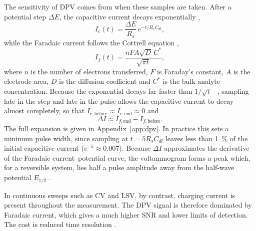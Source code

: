 The sensitivity of \ac{DPV} comes from when these samples are taken. After a potential step $\Delta E$, the capacitive current decays exponentially \cite{palmsens_capacitive_current},
\begin{equation}
  I_c(t) = \frac{\Delta E}{R_s}\, e^{-t/R_sC_{dl}},
  \label{eq:ic}
\end{equation}
while the Faradaic current follows the Cottrell equation \cite{bard2001},
\begin{equation}
  I_f(t) = \frac{nFA\sqrt{D}\,C^*}{\sqrt{\pi t}},
  \label{eq:cottrell}
\end{equation}
where $n$ is the number of electrons transferred, $F$ is Faraday's constant, $A$ is the electrode area, $D$ is the diffusion coefficient and $C^*$ is the bulk analyte concentration. Because the exponential decays far faster than $1/\sqrt{t}$ ~\cite[Sec.~1.2.4, Sec.~5.2.1]{bard2001}, sampling late in the step and late in the pulse allows the capacitive current to decay almost completely, so that $I_{c,\text{before}} \approx I_{c,\text{end}} \approx 0$ and
\begin{equation}
  \Delta I \approx I_{f,\text{end}} - I_{f,\text{before}}.
  \label{eq:delta_if}
\end{equation}
The full expansion is given in Appendix~\ref{app:dpv}. In practice this sets a minimum pulse width, since sampling at $t = 5R_sC_{dl}$ leaves less than \SI{1}{\percent} of the initial capacitive current ($e^{-5} \approx 0.007$). Because $\Delta I$ approximates the derivative of the Faradaic current--potential curve, the voltammogram forms a peak which, for a reversible system, lies half a pulse amplitude away from the half-wave potential $E_{1/2}$ \cite{bard2001}.

In continuous sweeps such as CV and LSV, by contrast, charging current is present throughout the measurement. The \ac{DPV} signal is therefore dominated by Faradaic current, which gives a much higher \ac{SNR} and lower limits of detection. The cost is reduced time resolution \cite{alyamni2024}.


